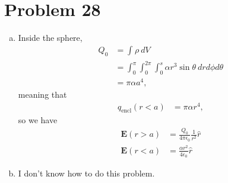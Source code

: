 \documentclass[10pt]{mypackage}
\begin{document}
\section{Problem 28}%
\begin{enumerate}[(a)]
  \item Inside the sphere, 
    \begin{align*}
      Q_0 &= \int_{}^{} \rho \:dV\\
                      &= \int_{0}^{\pi}\int_{0}^{2\pi}\int_{0}^{s} \alpha r^3\sin\theta\:drd\phi d\theta\\
                      &= \pi \alpha a^4,
    \end{align*}
    meaning that
    \begin{align*}
      q_{\text{encl}}\left(r < a\right) &= \pi \alpha r^4,
    \end{align*}
    so we have
    \begin{align*}
      \mathbf{E}\left(r > a\right) &= \frac{Q_0}{4\pi \epsilon_0}\frac{1}{r^2}\hat{r}\\
      \mathbf{E}\left(r < a\right) &= \frac{\alpha r^2}{4\epsilon_0}\hat{r}
    \end{align*}
  \item I don't know how to do this problem.
\end{enumerate}
\end{document}
